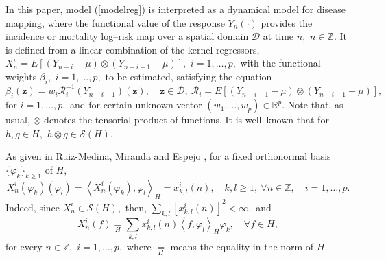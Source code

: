 \documentclass[11pt,a4paper]{article}
\begin{document}
In this paper, model (\ref{modelreg}) is interpreted   as a dynamical model for disease mapping, where the functional value of the response  $Y_{n}(\cdot )$ provides the incidence or mortality log--risk map over a spatial domain $\mathcal{D}$ at  time  $n,$ $n\in \mathbb{Z}.$ It
 is defined from a linear combination of the kernel  regressors, $X_{n}^{i}=E[(Y_{n-i}-\mu)\otimes (Y_{n-i-1}-\mu)],$  $i=1,\dots, p,$ with the functional weights $\beta_{i},$ $i=1,\dots,p,$  to be estimated, satisfying   the equation
 $$\beta_{i}(\mathbf{z})=w_{i}\mathcal{R}^{-1}_{i}(Y_{n-i-1})(\mathbf{z}),\quad  \mathbf{z}\in \mathcal{D},\ \mathcal{R}_{i}=E[(Y_{n-i-1}-\mu)\otimes (Y_{n-i-1}-\mu)],$$
\noindent for $i=1,\dots ,p,$ and  for certain unknown vector $(w_{1},\dots, w_{p})\in \mathbb{R}^{p}.$  Note that, as usual, $\otimes $ denotes the tensorial product of functions. It is well--known that for $h,g\in H,$  $h\otimes g\in \mathcal{S}(H).$

 As given in Ruiz-Medina,  Miranda and  Espejo \cite{RuizMedinaMirandaEspejo19},
for  a fixed orthonormal basis $\{\varphi_{k}\}_{k\geq 1}$ of $H,$
\begin{equation} X_{n}^{i}(\varphi_{k})(\varphi_{l})=\left\langle X_{n}^{i}(\varphi_{k}),\varphi_{l}\right\rangle_{H}=x^{i}_{k,l}(n),\quad k,l\geq 1,\ \forall n\in \mathbb{Z},\quad i=1,\dots,p.\label{regressors}\end{equation}
\noindent Indeed, since $X_{n}^{i}\in \mathcal{S}(H),$    then, $\sum_{k,l}[x^{i}_{k,l}(n)]^{2}<\infty,$ and
\begin{equation}X_{n}^{i}(f)\underset{H}{=}\sum_{k,l}x^{i}_{k,l}(n)\left\langle f,\varphi_{l}\right\rangle_{H}\varphi_{k},\quad \forall f\in H,\label{regressors2}\end{equation}
\noindent  for every  $n\in \mathbb{Z},$ $i=1,\dots,p,$ where $\underset{H}{=}$ means the equality in the norm of $H.$
\end{document}
